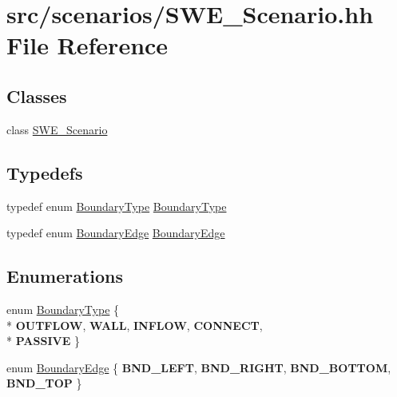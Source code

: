 \hypertarget{SWE__Scenario_8hh}{\section{src/scenarios/\-S\-W\-E\-\_\-\-Scenario.hh File Reference}
\label{SWE__Scenario_8hh}
}
\subsection*{Classes}
\begin{DoxyCompactItemize}
\item 
class \hyperlink{classSWE__Scenario}{S\-W\-E\-\_\-\-Scenario}
\end{DoxyCompactItemize}
\subsection*{Typedefs}
\begin{DoxyCompactItemize}
\item 
typedef enum \hyperlink{SWE__Scenario_8hh_af75d5dd7322fa39ed0af4e7839e600f8}{Boundary\-Type} \hyperlink{SWE__Scenario_8hh_a0076a482278ddc13ed179c6c76c9b5ad}{Boundary\-Type}
\item 
typedef enum \hyperlink{SWE__Scenario_8hh_aa5e01e3f7df312f7b9b0d02521141fcc}{Boundary\-Edge} \hyperlink{SWE__Scenario_8hh_a53b43e70a19e542b4c1ab2da9c6bcc0e}{Boundary\-Edge}
\end{DoxyCompactItemize}
\subsection*{Enumerations}
\begin{DoxyCompactItemize}
\item 
enum \hyperlink{SWE__Scenario_8hh_af75d5dd7322fa39ed0af4e7839e600f8}{Boundary\-Type} \{ \\*
{\bfseries O\-U\-T\-F\-L\-O\-W}, 
{\bfseries W\-A\-L\-L}, 
{\bfseries I\-N\-F\-L\-O\-W}, 
{\bfseries C\-O\-N\-N\-E\-C\-T}, 
\\*
{\bfseries P\-A\-S\-S\-I\-V\-E}
 \}
\item 
enum \hyperlink{SWE__Scenario_8hh_aa5e01e3f7df312f7b9b0d02521141fcc}{Boundary\-Edge} \{ {\bfseries B\-N\-D\-\_\-\-L\-E\-F\-T}, 
{\bfseries B\-N\-D\-\_\-\-R\-I\-G\-H\-T}, 
{\bfseries B\-N\-D\-\_\-\-B\-O\-T\-T\-O\-M}, 
{\bfseries B\-N\-D\-\_\-\-T\-O\-P}
 \}
\end{DoxyCompactItemize}


